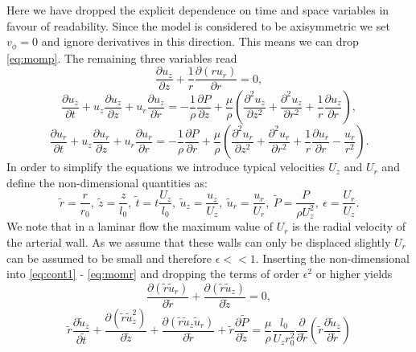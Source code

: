 \documentclass[a4paper, oneside]{discothesis}
\begin{document}
Here we have dropped the explicit dependence on time and space variables in favour of readability.
Since the model is considered to be axisymmetric we set $v_\phi=0$ and ignore derivatives in this direction.
This means we can drop \autoref{eq:momp}.
The remaining three variables read
\begin{equation}
	\frac{\partial u_z}{\partial z} + \frac{1}{r} \frac{\partial (r u_r)}{\partial r} = 0, \label{eq:cont1}
\end{equation}
\begin{equation}
	\frac{\partial u_z}{\partial t} + u_z \frac{\partial u_z}{\partial z} + u_r \frac{\partial u_z}{\partial r} = -\frac{1}{\rho} \frac{\partial P}{\partial z} + \frac{\mu}{\rho} \left( \frac{\partial^2 u_z}{\partial z^2} + \frac{\partial^2 u_z}{\partial r^2} + \frac{1}{r} \frac{\partial u_z}{\partial r} \right),
\end{equation}
\begin{equation}
	\frac{\partial u_r}{\partial t} + u_z \frac{\partial u_r}{\partial z} + u_r \frac{\partial u_r}{\partial r} = -\frac{1}{\rho} \frac{\partial P}{\partial r} + \frac{\mu}{\rho} \left( \frac{\partial^2 u_r}{\partial z^2} + \frac{\partial^2 u_r}{\partial r^2} + \frac{1}{r} \frac{\partial u_r}{\partial r} - \frac{u_r}{r^2}\right). \label{eq:momr}
\end{equation}
In order to simplify the equations we introduce typical velocities $U_z$ and $U_r$ and define the non-dimensional quantities as:
\begin{equation}
	\tilde{r} = \frac{r}{r_0}, \ \tilde{z} = \frac{z}{l_0}, \ \tilde{t} = t \frac{U_z}{l_0}, \ \tilde{u}_z = \frac{u_z}{U_z}, \ \tilde{u}_r = \frac{u_r}{U_r}, \ \tilde{P} = \frac{P}{\rho U_z^2}, \ \epsilon = \frac{U_r}{U_z}.
\end{equation}
We note that in a laminar flow the maximum value of $U_r$ is the radial velocity of the arterial wall.
As we assume that these walls can only be displaced slightly $U_r$ can be assumed to be small and therefore $\epsilon << 1$. \cite{womersley1957elastic}
Inserting the non-dimensional into \autoref{eq:cont1} - \autoref{eq:momr} and dropping the terms of order $\epsilon^2$ or higher yields
\begin{equation}
	\frac{\partial (\tilde{r} \tilde{u}_r)}{\partial \tilde{r}} + \frac{\partial (\tilde{r} \tilde{u}_z)}{\partial\tilde{z}} = 0, \label{eq:cont2}
\end{equation}
\begin{equation}
	\tilde{r} \frac{\partial \tilde{u}_z}{\partial \tilde{t}} + \frac{ \partial (\tilde{r} \tilde{u}_z^2)}{\partial \tilde{z}} + \frac{ \partial (\tilde{r} \tilde{u}_z \tilde{u}_r)}{\partial \tilde{r}} + \tilde{r} \frac{\partial \tilde{P}}{\partial \tilde{z}} = \frac{\mu}{\rho} \frac{l_0}{U_z r_0^2} \frac{\partial}{\partial \tilde{r}} \left( \tilde{r} \frac{\partial \tilde{u}_z}{\partial \tilde{r}} \right) \label{eq:momz}
\end{equation}
\end{document}
